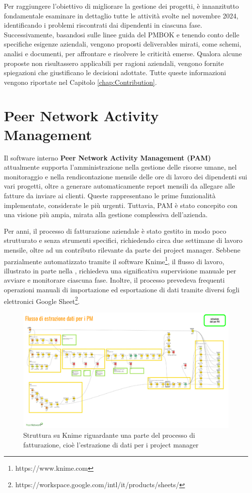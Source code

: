 Per raggiungere l'obiettivo di migliorare la gestione dei progetti, è innanzitutto fondamentale esaminare in dettaglio tutte le attività svolte nel novembre 2024,
identificando i problemi riscontrati dai dipendenti in ciascuna fase. Successivamente, basandosi sulle linee guida del \ac{PMBOK} e tenendo conto delle specifiche
esigenze aziendali, vengono proposti deliverables mirati, come schemi, analisi e documenti, per affrontare e risolvere le criticità emerse. Qualora alcune proposte
non risultassero applicabili per ragioni aziendali, vengono fornite spiegazioni che giustificano le decisioni adottate. Tutte queste informazioni vengono riportate
nel Capitolo \ref{chap:Contribution}.

\section{Peer Network Activity Management}
Il software interno \textbf{Peer Network Activity Management (PAM)} attualmente supporta l’amministrazione nella gestione delle risorse umane, nel monitoraggio e nella rendicontazione mensile
delle ore di lavoro dei dipendenti sui vari progetti, oltre a generare automaticamente report mensili da allegare alle fatture da inviare ai clienti.
Queste rappresentano le prime funzionalità implementate, considerate le più urgenti. Tuttavia, \ac{PAM} è stato concepito con una visione più ampia, mirata
alla gestione complessiva dell'azienda.

Per anni, il processo di fatturazione aziendale è stato gestito in modo poco strutturato e senza strumenti specifici, richiedendo circa due settimane
di lavoro mensile, oltre ad un contributo rilevante da parte dei project manager. Sebbene parzialmente automatizzato tramite il software Knime\footnote{https://www.knime.com},
il flusso di lavoro, illustrato in parte nella , richiedeva una significativa supervisione manuale per avviare e monitorare ciascuna fase.
Inoltre, il processo prevedeva frequenti operazioni manuali di importazione ed esportazione di dati tramite diversi fogli elettronici Google
Sheet\footnote{https://workspace.google.com/intl/it/products/sheets/}.

\begin{figure}
    \centering
    \includegraphics[width=\linewidth]{figures/FatturazioneKnime.pdf}
    \caption{Struttura su Knime riguardante una parte del processo di fatturazione, cioè l’estrazione di dati per i project manager}
    \label{fig:fatturazione-knime}
\end{figure}

